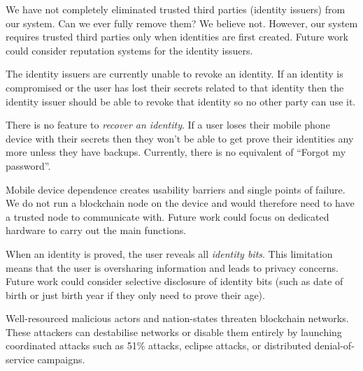 We have not completely eliminated trusted third parties (identity issuers) from our system. Can we ever fully remove them? We believe not. However, our system requires trusted third parties only when identities are first created. Future work could consider reputation systems for the identity issuers.

The identity issuers are currently unable to revoke an identity. If an identity is compromised or the user has lost their secrets related to that identity then the identity issuer should be able to revoke that identity so no other party can use it.

There is no feature to \textit{recover an identity}. If a user loses their mobile phone device with their secrets then they won't be able to get prove their identities any more unless they have backups. Currently, there is no equivalent of ``Forgot my password''.

Mobile device dependence creates usability barriers and single points of failure. We do not run a blockchain node on the device and would therefore need to have a trusted node to communicate with. Future work could focus on dedicated hardware to carry out the main \deeid functions.

When an identity is proved, the user reveals all \textit{identity bits}. This limitation means that the user is oversharing information and leads to privacy concerns. Future work could consider selective disclosure of identity bits (such as date of birth or just birth year if they only need to prove their age).


Well-resourced malicious actors and nation-states threaten blockchain networks. These attackers can destabilise networks or disable them entirely by launching coordinated attacks such as 51\% attacks, eclipse attacks, or distributed denial-of-service campaigns.

